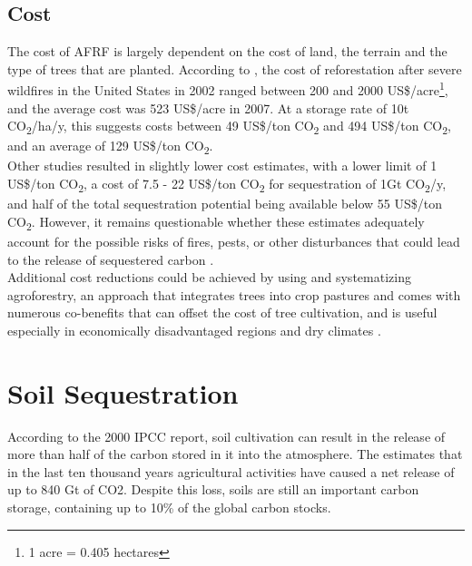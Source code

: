 \subsection*{Cost}
The cost of AFRF is largely dependent on the cost of land, the terrain and the type of trees that are planted. According to \textcite{Gorte2009U.S.Sequestration}, the cost of reforestation after severe wildfires in the United States in 2002 ranged between 200 and 2000 US\$/acre\footnote{1 acre = 0.405 hectares}, and the average cost was 523 US\$/acre in 2007. At a storage rate of 10t CO\textsubscript{2}/ha/y, this suggests costs between 49 US\$/ton CO\textsubscript{2}  and  494 US\$/ton CO\textsubscript{2}, and an average of 129 US\$/ton CO\textsubscript{2}.\\Other studies resulted in slightly lower cost estimates, with a lower limit of 1 US\$/ton CO\textsubscript{2}, a cost of 7.5 - 22 US\$/ton CO\textsubscript{2} for sequestration of 1Gt CO\textsubscript{2}/y, and half of the total sequestration potential being available below 55 US\$/ton CO\textsubscript{2}. However, it remains questionable whether these estimates adequately account for the possible risks of fires, pests, or other disturbances that could lead to the release of sequestered carbon \parencite[41-42]{NRC2015ClimateSequestration}.\\Additional cost reductions could be achieved by using and systematizing agroforestry, an approach that integrates trees into crop pastures and comes with numerous co-benefits that can offset the cost of tree cultivation, and is useful especially in economically disadvantaged regions and dry climates \parencite{Reij2014ImprovingAchievable}.

\section{Soil Sequestration}
According to the 2000 IPCC report, soil cultivation can result in the release of more than half of the carbon stored in it into the atmosphere. The \textcite{NRC2015ClimateSequestration} estimates that in the last ten thousand years agricultural activities have caused a net release of up to 840 Gt of CO2. Despite this loss, soils are still an important carbon storage, containing up to 10\% of the global carbon stocks.
